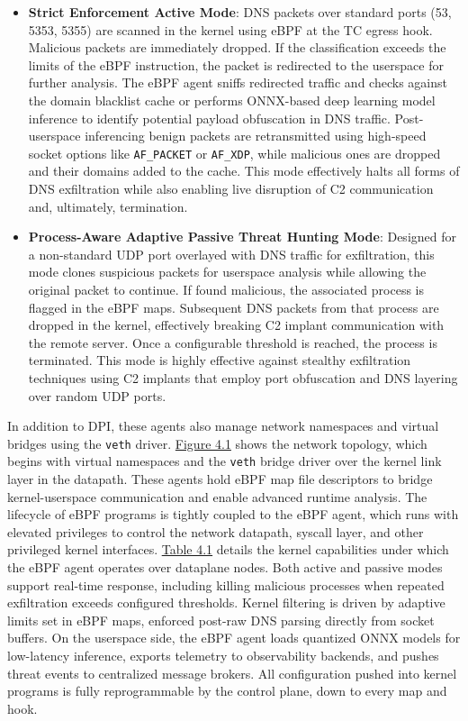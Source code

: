 \documentclass [11pt, proquest] {uwthesis}[2020/02/24]
\begin{document}
\begin{itemize}[itemsep=1pt,parsep=0pt]
    \item \textbf{Strict Enforcement Active Mode}: DNS packets over standard ports (53, 5353, 5355) are scanned in the kernel using eBPF at the TC egress hook. Malicious packets are immediately dropped. If the classification exceeds the limits of the eBPF instruction, the packet is redirected to the userspace for further analysis. The eBPF agent sniffs redirected traffic and checks against the domain blacklist cache or performs ONNX-based deep learning model inference to identify potential payload obfuscation in DNS traffic. Post-userspace inferencing benign packets are retransmitted using high-speed socket options like \texttt{AF\_PACKET} or \texttt{AF\_XDP}, while malicious ones are dropped and their domains added to the cache. This mode effectively halts all forms of DNS exfiltration while also enabling live disruption of C2 communication and, ultimately, termination.
    
    \item \textbf{Process-Aware Adaptive Passive Threat Hunting Mode}: Designed for a non-standard UDP port overlayed with DNS traffic for exfiltration, this mode clones suspicious packets for userspace analysis while allowing the original packet to continue. If found malicious, the associated process is flagged in the eBPF maps. Subsequent DNS packets from that process are dropped in the kernel, effectively breaking C2 implant communication with the remote server. Once a configurable threshold is reached, the process is terminated. This mode is highly effective against stealthy exfiltration techniques using C2 implants that employ port obfuscation and DNS layering over random UDP ports. 
\end{itemize}

In addition to DPI, these agents also manage network namespaces and virtual bridges using the \texttt{veth} driver. \hyperref[sec:dp_eBPF_agent_net_topology]{Figure 4.1} shows the network topology, which begins with virtual namespaces and the \texttt{veth} bridge driver over the kernel link layer in the datapath. These agents hold eBPF map file descriptors to bridge kernel-userspace communication and enable advanced runtime analysis. The lifecycle of eBPF programs is tightly coupled to the eBPF agent, which runs with elevated privileges to control the network datapath, syscall layer, and other privileged kernel interfaces. \hyperref[sec:dp_kernel_cap]{Table 4.1} details the kernel capabilities under which the eBPF agent operates over dataplane nodes. Both active and passive modes support real-time response, including killing malicious processes when repeated exfiltration exceeds configured thresholds. Kernel filtering is driven by adaptive limits set in eBPF maps, enforced post-raw DNS parsing directly from socket buffers. On the userspace side, the eBPF agent loads quantized ONNX models for low-latency inference, exports telemetry to observability backends, and pushes threat events to centralized message brokers. All configuration pushed into kernel programs is fully reprogrammable by the control plane, down to every map and hook.
\end{document}
